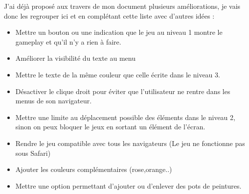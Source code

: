 \documentclass{article}
\begin{document}
\hspace*{0.6cm}J'ai d\'ej\`a propos\'e aux travers de mon document plusieurs am\'eliorations, je vais donc les regrouper ici et en compl\'etant cette liste avec d'autres id\'ees :\\
\begin{itemize}
  \item Mettre un bouton ou une indication que le jeu au niveau 1 montre le gameplay et qu'il n'y a rien \`a faire.
  \item Am\'eliorer la visibilit\'e du texte au menu
  \item Mettre le texte de la m\^eme couleur que celle \'ecrite dans le niveau 3.
  \item D\'esactiver le clique droit pour \'eviter que l'utilisateur ne rentre dans les menus de son navigateur.
  \item Mettre une limite au d\'eplacement possible des \'el\'ements dans le niveau 2, sinon on peux bloquer le jeux en sortant un \'el\'ement de l'\'ecran.
  \item Rendre le jeu compatible avec tous les navigateurs (Le jeu ne fonctionne pas sous Safari)
  \item Ajouter les couleurs compl\'ementaires (rose,orange..)
  \item Mettre une option permettant d'ajouter ou d'enlever des pots de peintures.
\end{itemize}
\end{document}
